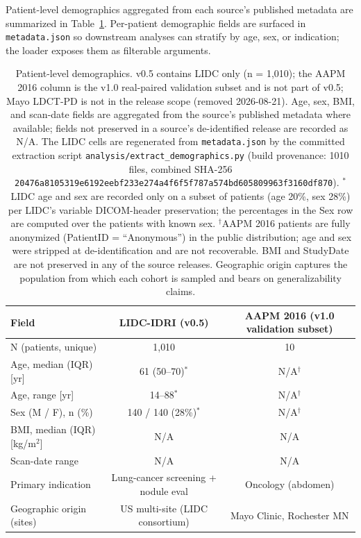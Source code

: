 \documentclass[twoside,11pt]{article}
\begin{document}
Patient-level demographics aggregated from each source's published metadata are summarized in Table~\ref{tab:demographics_v05}. Per-patient demographic fields are surfaced in \texttt{metadata.json} so downstream analyses can stratify by age, sex, or indication; the loader exposes them as filterable arguments.

\begin{table}[ht]
    \centering
    \small
    \setlength{\tabcolsep}{4pt}
    \begin{tabular}{lcc}
        \toprule
        \textbf{Field} & \textbf{LIDC-IDRI (v0.5)} & \textbf{AAPM 2016 (v1.0 validation subset)} \\
        \midrule
        N (patients, unique)                          & 1{,}010          & 10 \\
        Age, median (IQR) [yr]                        & 61 (50--70)$^{*}$ & N/A$^{\dagger}$ \\
        Age, range [yr]                               & 14--88$^{*}$       & N/A$^{\dagger}$ \\
        Sex (M / F), n (\%)                           & 140 / 140 (28\%)$^{*}$ & N/A$^{\dagger}$ \\
        BMI, median (IQR) [kg/m$^2$]                  & N/A              & N/A \\
        Scan-date range                               & N/A              & N/A \\
        Primary indication                            & Lung-cancer screening + nodule eval & Oncology (abdomen) \\
        Geographic origin (sites)                     & US multi-site (LIDC consortium) & Mayo Clinic, Rochester MN \\
        \bottomrule
    \end{tabular}
    \caption{Patient-level demographics. v0.5 contains LIDC only (n = 1{,}010); the AAPM 2016 column is the v1.0 real-paired validation subset and is not part of v0.5; Mayo LDCT-PD is not in the release scope (removed 2026-08-21). Age, sex, BMI, and scan-date fields are aggregated from the source's published metadata where available; fields not preserved in a source's de-identified release are recorded as N/A. The LIDC cells are regenerated from \texttt{metadata.json} by the committed extraction script \texttt{analysis/extract\_demographics.py} (build provenance: 1010 files, combined SHA-256 \texttt{20476a8105319e6192eebf233e274a4f6f5f787a574bd605809963f3160df870}). $^{*}$LIDC age and sex are recorded only on a subset of patients (age 20\%, sex 28\%) per LIDC's variable DICOM-header preservation; the percentages in the Sex row are computed over the patients with known sex. $^{\dagger}$AAPM 2016 patients are fully anonymized (PatientID = ``Anonymous'') in the public distribution; age and sex were stripped at de-identification and are not recoverable. BMI and StudyDate are not preserved in any of the source releases. Geographic origin captures the population from which each cohort is sampled and bears on generalizability claims.}
    \label{tab:demographics_v05}
\end{table}
\end{document}
